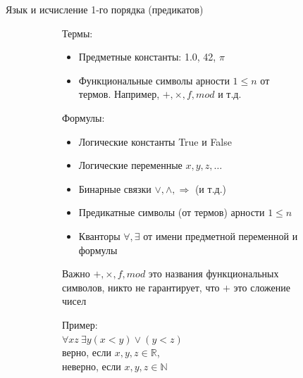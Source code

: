 \begin{frame}{Язык и исчисление 1-го порядка (предикатов)}
\begin{figure}[t]
  \begin{subfigure}[t]{0.5\textwidth}
    Термы:
    \begin{itemize}
      \item Предметные константы: 1.0, 42, $\pi$
      \item Функциональные символы арности  $1\leqslant n$ от термов. Например, $+, \times, f, mod$ и т.д.
    \end{itemize}
    Формулы:
    \begin{itemize}
  \item Логические константы True и False
  \item Логические переменные $x,y,z,\dots$
  \item Бинарные связки $\vee, \wedge, \Rightarrow$ (и т.д.) %
  \item Предикатные символы (от термов) арности $1\leqslant n$
  \item Кванторы $\forall, \exists$ от имени предметной переменной и формулы
    \end{itemize}
  \end{subfigure}
\hspace{0.05\textwidth}
  \begin{subfigure}[t]{0.4\textwidth}
    \begin{block}{Важно}
      $+, \times, f, mod$ это названия функциональных символов, никто не гарантирует, что  $+$ это сложение чисел
    \end{block}
\vspace{1em}
Пример: \\
$\forall x z\ \exists y (x < y) \vee (y < z)$\\
верно, если $x,y,z \in \mathbb{R}$, \\
неверно, если $x,y,z \in \mathbb{N}$
  \end{subfigure}
\end{figure}
\end{frame}

